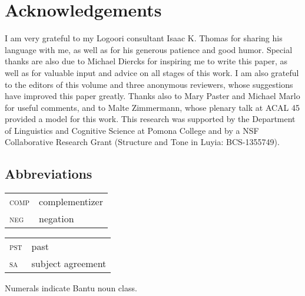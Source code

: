 \documentclass[output=paper]{langsci/langscibook}
\begin{document}
\section*{Acknowledgements}

I am very grateful to my Logoori consultant Isaac K. Thomas for sharing his language with me, as well as for his generous patience and good humor. Special thanks are also due to Michael Diercks for inspiring me to write this paper, as well as for valuable input and advice on all stages of this work. I am also grateful to the editors of this volume and three anonymous reviewers, whose suggestions have improved this paper greatly. Thanks also to Mary Paster and Michael Marlo for useful comments, and to Malte Zimmermann, whose plenary talk at ACAL 45 provided a model for this work. This research was supported by the Department of Linguistics and Cognitive Science at Pomona College and by a NSF Collaborative Research Grant (Structure and Tone in Luyia: BCS-1355749).

\subsection*{Abbreviations}

\begin{tabularx}{.45\textwidth}{lX}
\textsc{comp} &  complementizer  \\
\textsc{neg} &  negation  
\end{tabularx}
\begin{tabularx}{.45\textwidth}{lX}
\textsc{pst} &  past \\
\textsc{sa}  & subject agreement\\
\end{tabularx}

\medskip
Numerals indicate Bantu noun class.

\printbibliography[heading=subbibliography,notkeyword=this]
\end{document}
